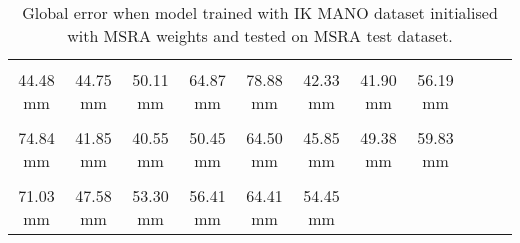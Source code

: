 \begin{table}[!ht]
    \begin{tabular}{|c|c|c|c|c|c|c|c|c|c|c|}
    \hline
    \cellcolor[HTML]{ffff00}{\bfseries Wrist} & \cellcolor[HTML]{ffff00}{\bfseries IMCP} & \cellcolor[HTML]{ffbf00}{\bfseries IPIP} & \cellcolor[HTML]{ff8000}{\bfseries IDIP} & \cellcolor[HTML]{ff7500}{\bfseries ITIP} & \cellcolor[HTML]{ffff00}{\bfseries MMCP} & \cellcolor[HTML]{ffff00}{\bfseries MPIP} & \cellcolor[HTML]{ffbf00}{\bfseries MDIP}  \\
    \cellcolor[HTML]{ffff00}$\,\,\,$44.48 mm & \cellcolor[HTML]{ffff00}$\,\,\,$44.75 mm & \cellcolor[HTML]{ffbf00}$\,\,\,$50.11 mm & \cellcolor[HTML]{ff8000}$\,\,\,$64.87 mm & \cellcolor[HTML]{ff7500}$\,\,\,$78.88 mm & \cellcolor[HTML]{ffff00}$\,\,\,$42.33 mm & \cellcolor[HTML]{ffff00}$\,\,\,$41.90 mm & \cellcolor[HTML]{ffbf00}$\,\,\,$56.19 mm\\
    \hline
    \cellcolor[HTML]{ff7500}{\bfseries MTIP} & \cellcolor[HTML]{ffff00}{\bfseries RMCP} & \cellcolor[HTML]{ffff00}{\bfseries RPIP} & \cellcolor[HTML]{ffbf00}{\bfseries RDIP} & \cellcolor[HTML]{ff8000}{\bfseries RTIP} & \cellcolor[HTML]{ffff00}{\bfseries PMCP} & \cellcolor[HTML]{ffff00}{\bfseries PPIP} & \cellcolor[HTML]{ffbf00}{\bfseries PDIP}  \\
    \cellcolor[HTML]{ff7500}$\,\,\,$74.84 mm & \cellcolor[HTML]{ffff00}$\,\,\,$41.85 mm & \cellcolor[HTML]{ffff00}$\,\,\,$40.55 mm & \cellcolor[HTML]{ffbf00}$\,\,\,$50.45 mm & \cellcolor[HTML]{ff8000}$\,\,\,$64.50 mm & \cellcolor[HTML]{ffff00}$\,\,\,$45.85 mm & \cellcolor[HTML]{ffff00}$\,\,\,$49.38 mm & \cellcolor[HTML]{ffbf00}$\,\,\,$59.83 mm\\
    \hline
    \cellcolor[HTML]{ff7500}{\bfseries PTIP} & \cellcolor[HTML]{ffff00}{\bfseries TMCP} & \cellcolor[HTML]{ffbf00}{\bfseries TPIP} & \cellcolor[HTML]{ffbf00}{\bfseries PDIP} & \cellcolor[HTML]{ff8000}{\bfseries TTIP} & \cellcolor[HTML]{ffbf00}{\bfseries Average}  \\
    \cellcolor[HTML]{ff7500}$\,\,\,$71.03 mm & \cellcolor[HTML]{ffff00}$\,\,\,$47.58 mm & \cellcolor[HTML]{ffbf00}$\,\,\,$53.30 mm & \cellcolor[HTML]{ffbf00}$\,\,\,$56.41 mm & \cellcolor[HTML]{ff8000}$\,\,\,$64.41 mm & \cellcolor[HTML]{ffbf00}$\,\,\,$54.45 mm \\
    \cline{1-6}
    \end{tabular}
    \caption{Global error when model trained with IK MANO dataset initialised with MSRA weights and tested on MSRA test dataset.}
    \label{tb:amag}
    \end{table}

